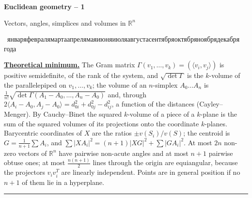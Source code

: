 \documentclass[11pt,a4paper]{article}
\newcommand{\head}[1]{\par\medskip\noindent\textbf{\underline{#1}}\quad}
\newcommand{\sheettitle}[3]{%
  \begin{center}
  {\huge\bfseries #1\par}\vspace{1.2em}
  {\Large #2\par}\vspace{0.8em}
  \if\relax\detokenize{#3}\relax\else{\Large #3\par}\vspace{0.8em}\fi
  {\foreignlanguage{russian}{\rudate}\par}
  \end{center}\vspace{0.5em}}
\newcommand{\rudate}{\number\day~\ifcase\month\or января\or февраля\or марта\or апреля\or мая\or июня\or июля\or августа\or сентября\or октября\or ноября\or декабря\fi~\number\year~года}
\begin{document}
\setlength{\emergencystretch}{2em}
\sheettitle{Euclidean geometry -- 1}{Vectors, angles, simplices and volumes in $\mathbb{R}^n$}{Homework}

\head{Theoretical minimum.} The Gram matrix
$\Gamma(v_1,\dots,v_k)=(\langle v_i,v_j\rangle)$ is positive semidefinite, of the
rank of the system, and $\sqrt{\det\Gamma}$ is the $k$-volume of the parallelepiped
on $v_1,\dots,v_k$; the volume of an $n$-simplex $A_0\dots A_n$ is
$\frac1{n!}\sqrt{\det\Gamma(A_1-A_0,\dots,A_n-A_0)}$ and, through
$2\langle A_i-A_0,A_j-A_0\rangle=d_{0i}^2+d_{0j}^2-d_{ij}^2$, a function of the
distances (Cayley--Menger). By Cauchy--Binet the squared $k$-volume of a piece of a
$k$-plane is the sum of the squared volumes of its projections onto the coordinate
$k$-planes. Barycentric coordinates of $X$ are the ratios $\pm v(S_i)/v(S)$; the
centroid is $G=\frac1{n+1}\sum A_i$, and
$\sum|XA_i|^2=(n+1)|XG|^2+\sum|GA_i|^2$. At most $2n$ non-zero vectors of
$\mathbb{R}^n$ have pairwise non-acute angles and at most $n+1$ pairwise obtuse ones;
at most $\frac{n(n+1)}2$ lines through the origin are equiangular, because the
projectors $v_iv_i^T$ are linearly independent. Points are in general position if no
$n+1$ of them lie in a hyperplane.

\medskip\noindent\rule{\linewidth}{0.4pt}
\end{document}
